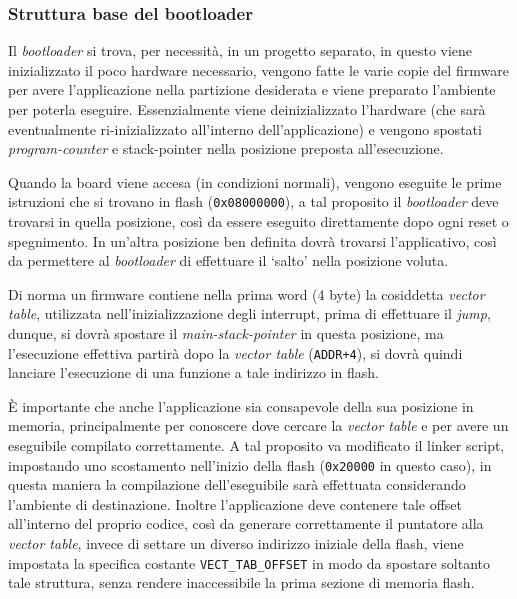\subsubsection{Struttura base del bootloader}

Il \textit{bootloader} si trova, per necessit\`a, in un progetto separato, in questo viene inizializzato il poco hardware necessario, vengono fatte le varie copie del firmware per avere l'applicazione nella partizione desiderata e viene preparato l'ambiente per poterla eseguire. Essenzialmente viene deinizializzato l'hardware (che sar\`a eventualmente ri-inizializzato all'interno dell'applicazione) e vengono spostati \textit{program-counter} e stack-pointer nella posizione preposta all'esecuzione.

Quando la board viene accesa (in condizioni normali), vengono eseguite le prime istruzioni che si trovano in flash (\texttt{0x08000000}), a tal proposito il \textit{bootloader} deve trovarsi in quella posizione, cos\`i da essere eseguito direttamente dopo ogni reset o spegnimento. In un'altra posizione ben definita dovr\`a trovarsi l'applicativo, cos\`i da permettere al \textit{bootloader} di effettuare il `salto' nella posizione voluta.

Di norma un firmware contiene nella prima word (4 byte) la cosiddetta \textit{vector table}, utilizzata nell'inizializzazione degli interrupt, prima di effettuare il \textit{jump}, dunque, si dovr\`a spostare il \textit{main-stack-pointer} in questa posizione, ma l'esecuzione effettiva partir\`a dopo la \textit{vector table} (\texttt{ADDR+4}), si dovr\`a quindi lanciare l'esecuzione di una funzione a tale indirizzo in flash.

\`E importante che anche l'applicazione sia consapevole della sua posizione in memoria, principalmente per conoscere dove cercare la \textit{vector table} e per avere un eseguibile compilato correttamente. A tal proposito va modificato il linker script, impostando uno scostamento nell'inizio della flash (\texttt{0x20000} in questo caso), in questa maniera la compilazione dell'eseguibile sar\`a effettuata considerando l'ambiente di destinazione. Inoltre l'applicazione deve contenere tale offset all'interno del proprio codice, cos\`i da generare correttamente il puntatore alla \textit{vector table}, invece di settare un diverso indirizzo iniziale della flash, viene impostata la specifica costante \texttt{VECT\_TAB\_OFFSET} in modo da spostare soltanto tale struttura, senza rendere inaccessibile la prima sezione di memoria flash.

